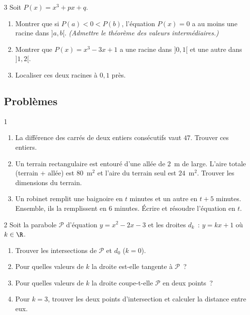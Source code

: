 \begin{exo}{3}
Soit $P(x) = x^3 + px + q$.
\begin{enumerate}
  \item Montrer que si $P(a) < 0 < P(b)$, l'\'equation $P(x)=0$ a au moins
        une racine dans $]a,b[$. \emph{(Admettre le th\'eor\`eme des valeurs interm\'ediaires.)}
  \item Montrer que $P(x) = x^3 - 3x + 1$ a une racine dans $]0,1[$
        et une autre dans $]1,2[$.
  \item Localiser ces deux racines \`a $0{,}1$ pr\`es.
\end{enumerate}
\end{exo}

\subsection*{Probl\`emes}

\begin{probleme}{1}
\begin{enumerate}
  \item La diff\'erence des carr\'es de deux entiers cons\'ecutifs vaut $47$.
        Trouver ces entiers.
  \item Un terrain rectangulaire est entour\'e d'une all\'ee de $2$~m de large.
        L'aire totale (terrain + all\'ee) est $80$~m$^2$ et l'aire du terrain seul
        est $24$~m$^2$. Trouver les dimensions du terrain.
  \item Un robinet remplit une baignoire en $t$ minutes et un autre
        en $t+5$ minutes. Ensemble, ils la remplissent en $6$ minutes.
        \'Ecrire et r\'esoudre l'\'equation en $t$.
\end{enumerate}
\end{probleme}

\begin{probleme}{2}
Soit la parabole $\mathcal{P}$ d'\'equation $y = x^2 - 2x - 3$
et les droites $d_k$~: $y = kx + 1$ o\`u $k \in \R$.
\begin{enumerate}
  \item Trouver les intersections de $\mathcal{P}$ et $d_0$ ($k=0$).
  \item Pour quelles valeurs de $k$ la droite est-elle tangente \`a $\mathcal{P}$~?
  \item Pour quelles valeurs de $k$ la droite coupe-t-elle $\mathcal{P}$ en deux points~?
  \item Pour $k=3$, trouver les deux points d'intersection et calculer la distance
        entre eux.
\end{enumerate}
\end{probleme}

